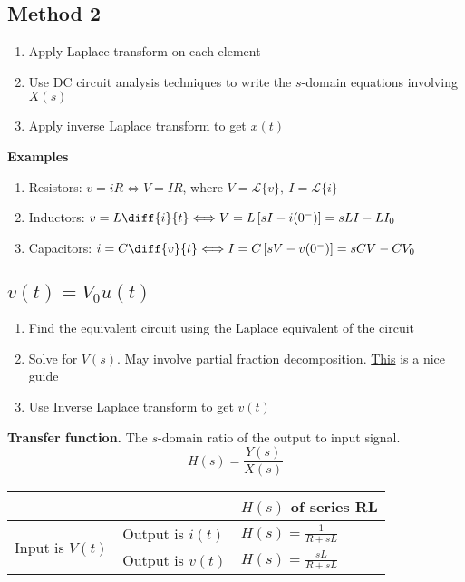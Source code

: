 \documentclass[a4paper,11pt]{article}
\begin{document}
	\subsection{Method 2}
	\begin{enumerate}
		\item Apply Laplace transform on each element
		\item Use DC circuit analysis techniques to write the $s$-domain equations involving $X(s)$
		\item Apply inverse Laplace transform to get $x(t)$
	\end{enumerate}
	
	\textbf{Examples}
	\begin{enumerate}
		\item Resistors: $v = iR \Longleftrightarrow V = IR$, where $V = \mathcal{L}\{v\},~I = \mathcal{L}\{i\}$
		\item Inductors: $v = L\diff{i}{t} \Longleftrightarrow V = L\left[sI - i(0^-)\right] = sLI - LI_0$
		\item Capacitors: $i = C\diff{v}{t} \Longleftrightarrow I = C\left[sV - v(0^-)\right] = sCV - CV_0$ 
	\end{enumerate}
	
	\subsection{$v(t) = V_0u(t)$}
	\begin{enumerate}
		\item Find the equivalent circuit using the Laplace equivalent of the circuit
		\item Solve for $V(s)$. May involve partial fraction decomposition. \href{https://cnx.org/exports/b2e3f8ad-9e60-4421-a343-97e64192ffce\%4015.pdf/partial-fraction-expansion-15.pdf}{This} is a nice guide
		\item Use Inverse Laplace transform to get $v(t)$ 
	\end{enumerate}
	\textbf{Transfer function.} The $s$-domain ratio of the output to input signal. 
	\begin{equation}
	H(s) = \frac{Y(s)}{X(s)}
	\end{equation}
	\begin{center}
	\begin{tabular}{|l|l|l|}
		\hline
		& & $H(s)$ of series RL \\ \hline
		\multirow{2}{*}{Input is $V(t)$} & Output is $i(t)$ & $H(s) = \frac{1}{R + sL}$ \\ \cline{2-3}
		& Output is $v(t)$ & $H(s) = \frac{sL}{R + sL}$ \\ \hline
	\end{tabular}
	\end{center}
	
\end{document}
